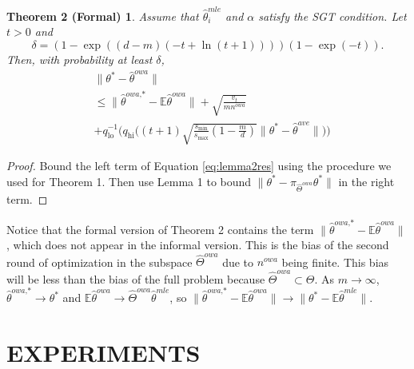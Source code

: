 \documentclass[twoside]{article}
\newcommand{\smin}{s_\text{min}}
\newcommand{\smax}{s_\text{max}}
\newcommand{\qhi}{q_\text{hi}}
\newcommand{\qlo}{q_\text{lo}}
\newcommand{\nowa}{n^{\textit{owa}}}
\newcommand{\W}{{\hat \Theta^{\textit{owa}}}}
\newcommand{\Wowa}{{\hat \Theta^{\textit{owa}}}}
\newcommand{\E}{\mathbb{E}}
\newcommand{\w}{\theta}
\newcommand{\wowa}{\hat\w^{owa}}
\newcommand{\wowastar}{\hat\w^{\textit{owa,*}}}
\newcommand{\wave}{\hat\w^{ave}}
\newcommand{\wmle}{\hat\w^{mle}}
\newcommand{\wstar}{{\w^{*}}}
\newcommand{\ltwo}[1]{{\lVert {#1} \rVert}}
\newcommand{\proj}[1]{\pi_{{#1}}}
\begin{document}
\newtheorem*{theoremformal}{Theorem 2 (Formal)}
\begin{theoremformal}
Assume that $\wmle_i$ and $\alpha$ satisfy the SGT condition.
Let $t>0$ and
\begin{equation}
\delta = (1-\exp((d-m)(-t+\ln(t+1))))(1-\exp(-t))
.
\end{equation}
Then, with probability at least $\delta$,
\begin{equation}
\begin{aligned}
&\ltwo{\wstar-\wowa}
\\
&\le
\ltwo{\wowastar-\E\wowa}
+ \sqrt{\frac{v_t}{m\nowa}}
\\
&+
\qlo^{-1}\bigg(\qhi\bigg((t+1)\sqrt{\frac{\smin}{\smax}\left(1-\frac{m}{d}\right)}\ltwo{\wstar-\wave}\bigg)\bigg)
\end{aligned}
\end{equation}
\end{theoremformal}

\begin{proof}
Bound the left term of Equation \ref{eq:lemma2res} using the procedure we used for Theorem 1.
Then use Lemma 1 to bound $\ltwo{\wstar-\proj\W\wstar}$ in the right term.
\end{proof}

\newpage

Notice that the formal version of Theorem 2 contains the term $\ltwo{\wowastar-\E\wowa}$, which does not appear in the informal version.
This is the bias of the second round of optimization in the subspace $\Wowa$ due to $\nowa$ being finite.
This bias will be less than the bias of the full problem because $\Wowa\subset\Theta$.
As $m\to\infty$, $\wowastar\to\wstar$ and $\E\wowa\to\W\wmle$, so $\ltwo{\wowastar-\E\wowa}\to\ltwo{\wstar-\E\wmle}$.

\section{EXPERIMENTS}
\label{sec:exp}
\end{document}
